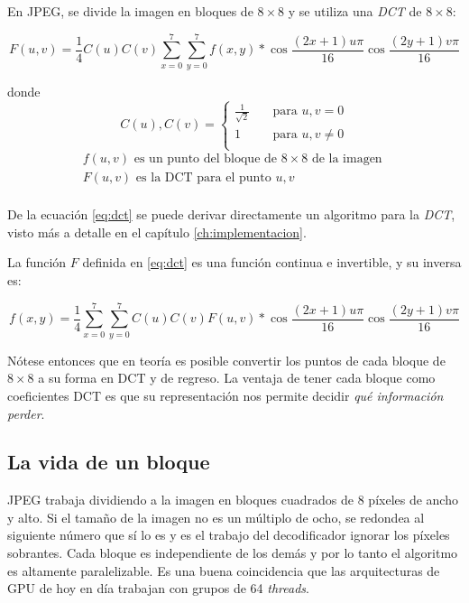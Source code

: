 En JPEG, se divide la imagen en bloques de $8\times8$ y se utiliza una
\emph{DCT} de $8\times8$:

\begin{equation}\label{eq:dct}
F(u, v) = \frac{1}{4} C(u)C(v) \sum_{x=0}^{7}\sum_{y=0}^{7}
f(x,y)*\cos{\frac{(2x+1)u\pi}{16}}\cos{\frac{(2y+1)v\pi}{16}}
\end{equation}

donde \[C(u), C(v) = \begin{cases}
        \frac{1}{\sqrt{2}} & \quad \text{para } u,v = 0\\
        1                  & \quad \text{para } u,v \neq 0\\
\end{cases} \]
\begin{eqnarray*}
    f(u, v) \text{ es un punto del bloque de } 8\times8 \text{ de la imagen }\\
    F(u, v) \text{ es la DCT para el punto } u,v\\
\end{eqnarray*}

De la ecuación \ref{eq:dct} se puede derivar directamente un algoritmo para la
\emph{DCT}, visto más a detalle en el capítulo \ref{ch:implementacion}.

La función $F$ definida en \ref{eq:dct} es una función continua e invertible, y
su inversa es:

\begin{equation}\label{eq:idct}
f(x, y) = \frac{1}{4} \sum_{x=0}^{7}\sum_{y=0}^{7} C(u)C(v) F(u, v)*
\cos{\frac{(2x+1)u\pi}{16}}\cos{\frac{(2y+1)v\pi}{16}}
\end{equation}

Nótese entonces que en teoría es posible convertir los puntos de cada bloque de
$8\times8$ a su forma en DCT y de regreso. La ventaja de tener cada bloque como
coeficientes DCT es que su representación nos permite decidir \emph{qué
información perder}.

\subsection{La vida de un bloque}\label{sub:vida}


JPEG trabaja dividiendo a la imagen en bloques cuadrados de 8 píxeles de ancho
y alto. Si el tamaño de la imagen no es un múltiplo de ocho, se redondea al
siguiente número que sí lo es y es el trabajo del decodificador ignorar los
píxeles sobrantes. Cada bloque es independiente de los demás y por lo tanto el
algoritmo es altamente paralelizable. Es una buena coincidencia que las
arquitecturas de \gls{GPU} de hoy en día trabajan con grupos de 64 \emph{threads}.

